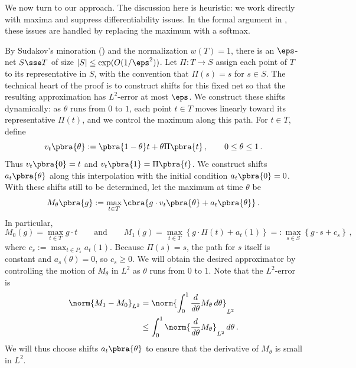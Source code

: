 \documentclass[11pt]{article}
\begin{document}
We now turn to our approach. 
The discussion here is heuristic: we work directly with maxima and suppress differentiability issues. 
In the formal argument in , these issues are handled by replacing the maximum with a softmax. 

By Sudakov's minoration () and the normalization $w(T)=1$, there is an $\eps$-net $S\sse T$ of size $|S|\leq \exp(O(1/\eps^2))$. 
Let $\Pi:T\to S$ assign each point of $T$ to its representative in $S$, with the convention that $\Pi(s)=s$ for $s\in S$. 
The technical heart of the proof is to construct shifts for this fixed net so that the resulting approximation has $L^2$-error at most $\eps$.
We construct these shifts dynamically:
as $\theta$ runs from $0$ to $1$, each point $t\in T$ moves linearly toward its representative $\Pi(t)$, and we control the maximum along this path. 
For $t\in T$, define
\[
    v_t\pbra{\theta}
    :=
    \pbra{1-\theta}t+\theta\Pi\pbra{t}\,,
    \qquad
    0\leq \theta\leq 1\,.
\]
Thus $v_t\pbra{0}=t$ and $v_t\pbra{1}=\Pi\pbra{t}$. 
We construct shifts $a_t\pbra{\theta}$ along this interpolation with the initial condition $a_t\pbra{0}=0$. 
With these shifts still to be determined, let the
maximum at time $\theta$ be
\[
    M_\theta\pbra{g}
    :=
    \max_{t\in T}
    \cbra{
        g\cdot v_t\pbra{\theta}+a_t\pbra{\theta}
    }\,.
\]
In particular, 
\[
	M_0(g)=\max_{t\in T}g\cdot t
	\qquad\text{and}\qquad 
	M_1(g)
	=
	\max_{t\in T}
	\left\{
		g\cdot \Pi(t)+a_t(1)
	\right\}
	=:
	\max_{s\in S}
	\left\{
		g\cdot s+c_s
	\right\}\,,
\]
where $c_s:=\max_{t \in P_s} a_t(1)$. 
Because $\Pi(s)=s$, the path for $s$ itself is constant and $a_s(\theta)=0$, so $c_s\geq 0$. 
We will obtain the desired approximator by controlling the motion of
$M_\theta$ in $L^2$ as $\theta$ runs from $0$ to $1$.
Note that the $L^2$-error is 
\begin{align}
    \norm{M_1-M_0}_{L^2}
    &=
    \norm{
        \int_0^1
        \frac{d}{d\theta}M_\theta
        \,d\theta
    }_{L^2} \nonumber \\ 
    &\leq
    \int_0^1
    \norm{
        \frac{d}{d\theta}M_\theta
    }_{L^2}
    \,d\theta\,. \label{eq:overview-our-goal}
\end{align} 
We will thus choose shifts $a_t\pbra{\theta}$ to ensure that the derivative of $M_\theta$ is small in $L^2$. 
\end{document}
